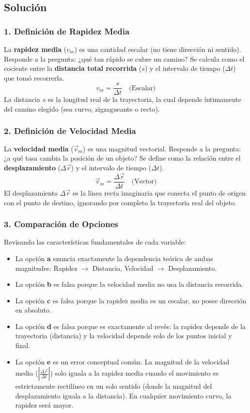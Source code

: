 \documentclass[12pt, a4paper]{article}
\begin{document}
\subsection*{Solución}

\subsubsection*{1. Definición de Rapidez Media}
La \textbf{rapidez media} ($v_m$) es una cantidad escalar (no tiene dirección ni sentido). Responde a la pregunta: ¿qué tan rápido se cubre un camino? Se calcula como el cociente entre la \textbf{distancia total recorrida} ($s$) y el intervalo de tiempo ($\Delta t$) que tomó recorrerla.
$$ v_m = \frac{s}{\Delta t} \quad \text{(Escalar)} $$
La distancia $s$ es la longitud real de la trayectoria, la cual depende íntimamente del camino elegido (sea curvo, zigzagueante o recto).

\subsubsection*{2. Definición de Velocidad Media}
La \textbf{velocidad media} ($\vec{v}_m$) es una magnitud vectorial. Responde a la pregunta: ¿a qué tasa cambia la posición de un objeto? Se define como la relación entre el \textbf{desplazamiento} ($\Delta\vec{r}$) y el intervalo de tiempo ($\Delta t$).
$$ \vec{v}_m = \frac{\Delta\vec{r}}{\Delta t} \quad \text{(Vector)} $$
El desplazamiento $\Delta\vec{r}$ es la línea recta imaginaria que conecta el punto de origen con el punto de destino, ignorando por completo la trayectoria real del objeto.

\subsubsection*{3. Comparación de Opciones}
Revisando las características fundamentales de cada variable:
\begin{itemize}
    \item La opción \textbf{a} enuncia exactamente la dependencia teórica de ambas magnitudes: Rapidez $\rightarrow$ Distancia, Velocidad $\rightarrow$ Desplazamiento.
    \item La opción \textbf{b} es falsa porque la velocidad media no usa la distancia recorrida.
    \item La opción \textbf{c} es falsa porque la rapidez media es un escalar, no posee dirección en absoluto.
    \item La opción \textbf{d} es falsa porque es exactamente al revés: la rapidez depende de la trayectoria (distancia) y la velocidad depende solo de los puntos inicial y final.
    \item La opción \textbf{e} es un error conceptual común. La magnitud de la velocidad media ($\left|\frac{\Delta\vec{r}}{\Delta t}\right|$) solo iguala a la rapidez media cuando el movimiento es estrictamente rectilíneo en un solo sentido (donde la magnitud del desplazamiento iguala a la distancia). En cualquier movimiento curvo, la rapidez será mayor.
\end{itemize}
\end{document}
